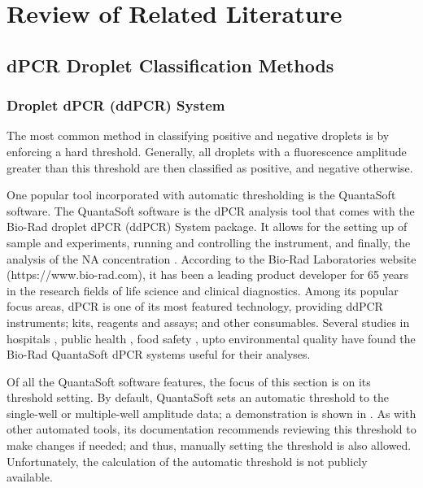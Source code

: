 \chapter{Review of Related Literature}
\label{sec:rrl} 

\section{dPCR Droplet Classification Methods}
\label{sec:dpcrclassifiers}

\subsection{Droplet dPCR (ddPCR) System}
\label{sec:ddpcrsystem}
The most common method in classifying positive and negative droplets is by enforcing a hard threshold. Generally, all droplets with a fluorescence amplitude greater than this threshold are then classified as positive, and negative otherwise. 

One popular tool incorporated with automatic thresholding is the QuantaSoft software. The QuantaSoft software is the dPCR analysis tool that comes with the Bio-Rad droplet dPCR (ddPCR) System package. It allows for the setting up of sample and experiments, running and controlling the instrument, and finally, the analysis of the NA concentration \cite{Bio-Rad2019}. According to the Bio-Rad Laboratories website (https://www.bio-rad.com), it has been a leading product developer for 65 years in the research fields of life science and clinical diagnostics. Among its popular focus areas, dPCR is one of its most featured technology, providing ddPCR instruments; kits, reagents and assays; and other consumables. Several studies in hospitals \cite{Lopez2016,Chen2018,Abed2017,Tagliapietra2020}, public health \cite{Hussain2017,Nystrand2018}, food safety \cite{Chen2020,Capobianco2020,Basanisi2020}, upto environmental quality \cite{Hamaguchi2018,Jahne2020,Dobnik2016,Mauvisseau2019} have found the Bio-Rad QuantaSoft dPCR systems useful for their analyses. 

Of all the QuantaSoft software features, the focus of this section is on its threshold setting. By default, QuantaSoft sets an automatic threshold to the single-well or multiple-well amplitude data; a demonstration is shown in . As with other automated tools, its documentation recommends reviewing this threshold to make changes if needed; and thus, manually setting the threshold is also allowed. Unfortunately, the calculation of the automatic threshold is not publicly available.

